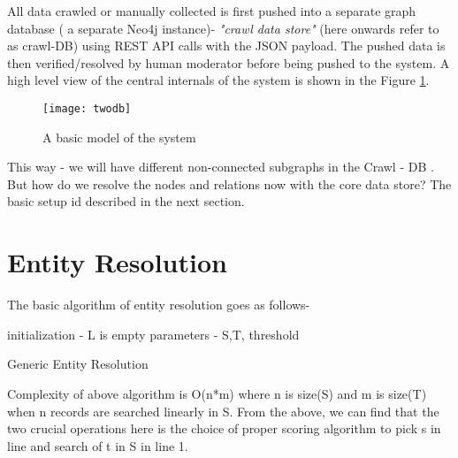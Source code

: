 All data crawled or manually collected is first pushed into a separate graph database ( a separate Neo4j instance)-  \emph{ "crawl data store" } (here onwards refer to as crawl-DB) using REST API calls with the JSON payload. The pushed data is then verified/resolved by human moderator before being pushed to the system. A high level view of the central internals of the system is shown in the Figure \ref{fig:twodb}.

\begin{figure}[H]
\begin{center}  
\texttt{[image: twodb]} 
\caption{A basic model of the system}
\label{fig:twodb}
\end{center}
\end{figure}

This way - we will have different non-connected subgraphs in the Crawl - DB .  
But how do we resolve the nodes and relations now with the core data store? The basic setup id described in the next section. 

\section{Entity Resolution}
\label{dataer}

The basic algorithm of entity resolution goes as follows-

\begin{algorithm}[H]
initialization - L is empty \;
parameters - S,T, threshold \;
 \caption{Generic Entity Resolution}
\end{algorithm}

Complexity of above algorithm is O(n*m) where n is size(S) and m is size(T) when n records are searched linearly in S.
        From the above, we can find that the two crucial operations here is the choice of proper scoring algorithm to pick s in line and search of t in S in line 1.

